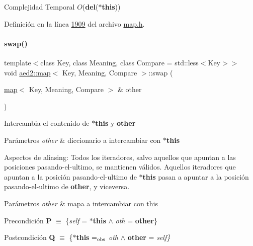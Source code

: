 \begin{DoxyDescription}
\item[Complejidad Temporal]$O$({\bfseries del}({\bfseries $\ast$this}))
\end{DoxyDescription}

Definición en la línea \hyperlink{map_8h_source_l01909}{1909} del archivo \hyperlink{map_8h_source}{map.\+h}.

\mbox{\label{classaed2_1_1map_a43ddb71cc91e5c6021a7a1f243d6cc4a_a43ddb71cc91e5c6021a7a1f243d6cc4a}} 
\paragraph{\texorpdfstring{swap()}{swap()}}
{\footnotesize\ttfamily template$<$class Key, class Meaning, class Compare = std\+::less$<$\+Key$>$$>$ \\
void \hyperlink{classaed2_1_1map}{aed2\+::map}$<$ Key, Meaning, Compare $>$\+::swap (\begin{DoxyParamCaption}\item[{\hyperlink{classaed2_1_1map}{map}$<$ Key, Meaning, Compare $>$ \&}]{other }\end{DoxyParamCaption})\hspace{0.3cm}{\ttfamily [inline]}}



Intercambia el contenido de {\bfseries $\ast$this} y {\bfseries other} 


\begin{DoxyParams}{Parámetros}
{\em other} & diccionario a intercambiar con {\bfseries $\ast$this}\\
\hline
\end{DoxyParams}
\begin{DoxyParagraph}{Aspectos de aliasing\+:}
Todos los iteradores, salvo aquellos que apuntan a las posiciones pasando-\/el-\/ultimo, se mantienen válidos. Aquellos iteradores que apuntan a la posición pasando-\/el-\/ultimo de {\bfseries $\ast$this} pasan a apuntar a la posición pasando-\/el-\/ultimo de {\bfseries other}, y viceversa.
\end{DoxyParagraph}

\begin{DoxyParams}{Parámetros}
{\em other} & mapa a intercambiar con this\\
\hline
\end{DoxyParams}
\begin{DoxyPrecond}{Precondición}
{\bfseries P} $\equiv$ \{{\itshape self} = {\bfseries $\ast$this} $\land$ {\itshape oth} = {\bfseries other}\} 
\end{DoxyPrecond}
\begin{DoxyPostcond}{Postcondición}
{\bfseries Q} $\equiv$ \{{\bfseries $\ast$this} $=_{\rm obs}$ {\itshape oth} $\land$ {\bfseries other} = {\itshape self\}} 
\end{DoxyPostcond}

